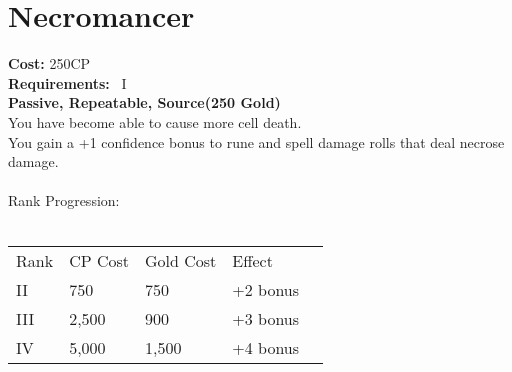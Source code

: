 \section{Necromancer}\label{perk:necromancer}
\textbf{Cost:} 250CP\\
\textbf{Requirements:}~ I\\
\textbf{Passive, Repeatable, Source(250 Gold)}\\
You have become able to cause more cell death.\\
You gain a +1 confidence bonus to rune and spell damage rolls that deal necrose damage.\\
\\
Rank Progression:\\
\\
\begin{tabular}{l | l | l | l | l}
    Rank & CP Cost & Gold Cost &  Effect\\
    II & 750 & 750 & +2 bonus\\
    III & 2,500 & 900 & +3 bonus\\
    IV & 5,000 & 1,500 & +4 bonus\\
\end{tabular}